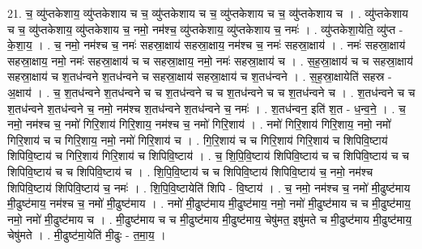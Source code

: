 \documentclass[17pt]{extarticle}
\begin{document}
21. च॒ व्यु॑प्तकेशाय॒ व्यु॑प्तकेशाय च च॒ व्यु॑प्तकेशाय च च॒ व्यु॑प्तकेशाय च च॒ व्यु॑प्तकेशाय च । . व्यु॑प्तकेशाय च च॒ व्यु॑प्तकेशाय॒ व्यु॑प्तकेशाय च॒ नमो॒ नम॑श्च॒ व्यु॑प्तकेशाय॒ व्यु॑प्तकेशाय च॒ नमः॑ । . व्यु॑प्तकेशा॒येति॒ व्यु॑प्त - के॒शा॒य॒ । . च॒ नमो॒ नम॑श्च च॒ नमः॑ सहस्रा॒क्षाय॑ सहस्रा॒क्षाय॒ नम॑श्च च॒ नमः॑ सहस्रा॒क्षाय॑ । . नमः॑ सहस्रा॒क्षाय॑ सहस्रा॒क्षाय॒ नमो॒ नमः॑ सहस्रा॒क्षाय॑ च च सहस्रा॒क्षाय॒ नमो॒ नमः॑ सहस्रा॒क्षाय॑ च । . स॒ह॒स्रा॒क्षाय॑ च च सहस्रा॒क्षाय॑ सहस्रा॒क्षाय॑ च श॒तध॑न्वने श॒तध॑न्वने च सहस्रा॒क्षाय॑ सहस्रा॒क्षाय॑ च श॒तध॑न्वने । . स॒ह॒स्रा॒क्षायेति॑ सहस्र - अ॒क्षाय॑ । . च॒ श॒तध॑न्वने श॒तध॑न्वने च च श॒तध॑न्वने च च श॒तध॑न्वने च च श॒तध॑न्वने च । . श॒तध॑न्वने च च श॒तध॑न्वने श॒तध॑न्वने च॒ नमो॒ नम॑श्च श॒तध॑न्वने श॒तध॑न्वने च॒ नमः॑ । . श॒तध॑न्वन॒ इति॑ श॒त - ध॒न्व॒ने॒ । . च॒ नमो॒ नम॑श्च च॒ नमो॑ गिरि॒शाय॑ गिरि॒शाय॒ नम॑श्च च॒ नमो॑ गिरि॒शाय॑ । . नमो॑ गिरि॒शाय॑ गिरि॒शाय॒ नमो॒ नमो॑ गिरि॒शाय॑ च च गिरि॒शाय॒ नमो॒ नमो॑ गिरि॒शाय॑ च । . गि॒रि॒शाय॑ च च गिरि॒शाय॑ गिरि॒शाय॑ च शिपिवि॒ष्टाय॑ शिपिवि॒ष्टाय॑ च गिरि॒शाय॑ गिरि॒शाय॑ च शिपिवि॒ष्टाय॑ । . च॒ शि॒पि॒वि॒ष्टाय॑ शिपिवि॒ष्टाय॑ च च शिपिवि॒ष्टाय॑ च च शिपिवि॒ष्टाय॑ च च शिपिवि॒ष्टाय॑ च । . शि॒पि॒वि॒ष्टाय॑ च च शिपिवि॒ष्टाय॑ शिपिवि॒ष्टाय॑ च॒ नमो॒ नम॑श्च शिपिवि॒ष्टाय॑ शिपिवि॒ष्टाय॑ च॒ नमः॑ । . शि॒पि॒वि॒ष्टायेति॑ शिपि - वि॒ष्टाय॑ । . च॒ नमो॒ नम॑श्च च॒ नमो॑ मी॒ढुष्ट॑माय मी॒ढुष्ट॑माय॒ नम॑श्च च॒ नमो॑ मी॒ढुष्ट॑माय । . नमो॑ मी॒ढुष्ट॑माय मी॒ढुष्ट॑माय॒ नमो॒ नमो॑ मी॒ढुष्ट॑माय च च मी॒ढुष्ट॑माय॒ नमो॒ नमो॑ मी॒ढुष्ट॑माय च । . मी॒ढुष्ट॑माय च च मी॒ढुष्ट॑माय मी॒ढुष्ट॑माय॒ चेषु॑मत॒ इषु॑मते च मी॒ढुष्ट॑माय मी॒ढुष्ट॑माय॒ चेषु॑मते । . मी॒ढुष्ट॑मा॒येति॑ मी॒ढुः - त॒मा॒य॒ । \newline
\end{document}
